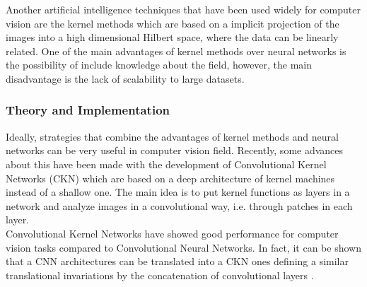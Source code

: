 \documentclass{article}
\begin{document}
Another artificial intelligence techniques that have been used widely for computer vision are the kernel methods  \cite{LampertKernel} which are based on a implicit projection of the images into a high dimensional Hilbert space, where the data can be linearly related. One of the  main advantages of kernel methods over neural networks is the possibility of include knowledge about the field, however, the main disadvantage is the lack of scalability to large datasets.\\

\subsubsection{Theory and Implementation}

Ideally, strategies that combine the advantages of kernel methods and neural networks can be very useful in computer vision field. Recently, some advances about this have been made with the development of Convolutional Kernel Networks (CKN) \cite{NIPS2014_5348} which are based on a deep architecture of kernel machines instead of a shallow one. The main idea is to put kernel functions as layers in a network and analyze images in a convolutional way, i.e. through patches in each layer.\\

Convolutional Kernel Networks have showed good performance for computer vision tasks compared to Convolutional Neural Networks. In fact, it can be shown that a CNN architectures can be translated into a CKN ones defining a similar translational invariations by the concatenation of convolutional layers \cite{DBLP:journals/corr/abs-1904-03955}.\\ 
\end{document}
